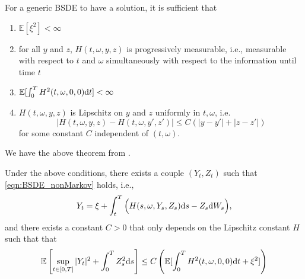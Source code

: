 \documentclass[11pt]{book}
\newcommand{\dt}{\text{\normalfont d}t}
\newcommand{\ds}{\text{\normalfont d}s}
\newcommand{\dW}{\text{\normalfont d}W}
\begin{document}
For a generic BSDE to have a solution, it is sufficient that 
\begin{enumerate}[label= \bfseries \arabic*)]
    \item $\mathbb{E}[\xi^2]<\infty$
    \item for all $y$ and $z$, $H(t,\omega,y,z)$ is progressively measurable, i.e., measurable with respect to $t$ and $\omega$ simultaneously with respect to the information until time $t$
    \item $\mathbb{E}[\int_0^T H^2(t,\omega,0,0)\dt]<\infty$
    \item $H(t,\omega,y,z)$ is Lipschitz on $y$ and $z$ uniformly in $t,\omega$, i.e.
    \[
    |H(t,\omega,y,z)-H(t,\omega,y',z')|
    \le C(|y-y'|+|z-z'|)
    \]
    for some constant $C$ independent of $(t,\omega)$.
\end{enumerate}
We have the above theorem from \cite[Proposition~1.1]{pardoux98}.
\begin{thm}
Under the above conditions,  there exists a couple $(Y_t,Z_t)$ such that \eqref{eqn:BSDE_nonMarkov} holds, i.e.,
\begin{equation}
Y_t=\xi+\int_t^T \Big(H(s,\omega,Y_s,Z_s){{\ds}}-Z_s\dW_s\Big),
\end{equation}
and there exists a constant $C>0$ that only depends on the Lipschitz constant $H$ such that that
\begin{equation}
\mathbb{E}\left[\sup_{t\in[0,T]}|Y_t|^2+\int_0^TZ_s^2{{\ds}}\right]\le C\left(\mathbb{E}[\int_0^TH^2(t,\omega,0,0)\dt + \xi^2]\right)
\end{equation}
\end{thm}
\end{document}
